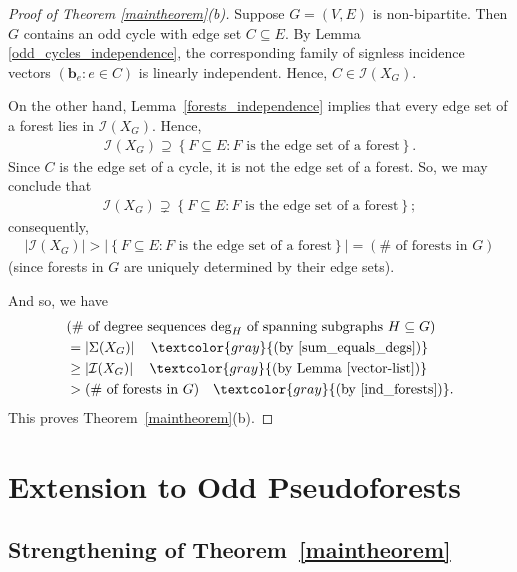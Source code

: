 \documentclass[12pt]{article}
\theoremstyle{definition}
\theoremstyle{remark}
\newcommand{\set}[1]{\left\{ #1 \right\}}
\newcommand{\abs}[1]{\left| #1 \right|}
\newcommand{\tup}[1]{\left( #1 \right)}
\begin{document}
\begin{proof}[Proof of Theorem \ref{maintheorem}(b)] Suppose $G=(V,E)$ is non-bipartite. Then $G$ contains an odd cycle with edge set $C \subseteq E$. By Lemma \ref{odd_cycles_independence}, the corresponding family of signless incidence vectors $\tup{\mathbf{b}_e : e \in C}$ is linearly independent. Hence, $C \in \mathcal{I}(X_G)$.

On the other hand, Lemma~\ref{forests_independence} implies that every edge set of a forest lies in $\mathcal{I}(X_G)$. Hence, \begin{align*}
    \mathcal{I}(X_G) \supseteq \set{F \subseteq E : F \text{ is the edge set of a forest}}.
\end{align*} Since $C$ is the edge set of a cycle, it is not the edge set of a forest. So, we may conclude that \begin{align*}
    \mathcal{I}(X_G) \supsetneq \set{F \subseteq E : F \text{ is the edge set of a forest}};
\end{align*} consequently, \begin{align}\label{ind_forests}
    \abs{\mathcal{I}(X_G)}
    > \abs{\set{F \subseteq E : F \text{ is the edge set of a forest}}}
    = \tup{\# \text{ of forests in $G$}}
\end{align}
(since forests in $G$ are uniquely determined by their edge sets).

And so, we have \begin{align*}
    &(\# \text{ of degree sequences $\deg_H$ of spanning subgraphs $H \subseteq G$}) \\ &= \abs{\Sigma(X_G)} \quad \textcolor{gray}{\text{(by \eqref{sum_equals_degs})}} \\
    & \geq \abs{\mathcal{I}(X_G)} \quad \textcolor{gray}{\text{(by Lemma~\ref{vector-list})}} \\
    & > (\# \text{ of forests in $G$}) \quad \textcolor{gray}{(\text{by \eqref{ind_forests})}}.  
\end{align*} This proves Theorem~\ref{maintheorem}(b).
    
\end{proof}

\section{\label{sec.opf}Extension to Odd Pseudoforests}

\subsection{Strengthening of Theorem~\ref{maintheorem}}
\end{document}
